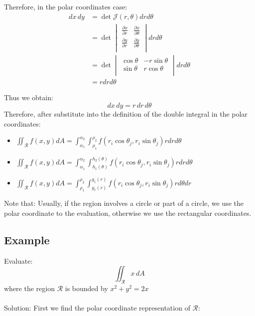 \documentclass[UTF8,a4paper, 10pt, openany]{svmono}
\begin{document}
Therefore, in the polar coordinates case:
\begin{align*}
dx \, dy& =\det\mathcal{J}(r,\theta)drd\theta\\
&=\det
\begin{vmatrix}
\frac{\partial x}{\partial r} & \frac{\partial x}{\partial \theta} \\
\frac{\partial y}{\partial r} & \frac{\partial y}{\partial \theta} \\
\end{vmatrix}drd\theta\\
&=\det
\begin{vmatrix}
\cos \theta & -r\sin \theta \\
\sin \theta & r\cos \theta \\
\end{vmatrix}drd\theta\\
&=rdrd\theta
\end{align*}

Thus we obtain:
$$dx \,dy=r \, dr \, d\theta$$
Therefore, after substitute into the definition of the double integral in the polar coordinates:

\begin{itemize}
\item $\displaystyle\iint_{\mathcal{R}}f(x,y)dA=\int_{\alpha_{1}}^{\alpha_{2}}\int_{\rho_{1}}^{\rho_{2}}f(r_{i}\cos \theta_{j},r_{i}\sin \theta_{j})rdrd\theta$
\item $\displaystyle\iint_{\mathcal{R}}f(x,y)dA=\int_{\alpha_{1}}^{\alpha_{2}}\int_{h_{1}(\theta)}^{h_{2}(\theta)}f(r_{i}\cos \theta_{j},r_{i}\sin \theta_{j})rdrd\theta$
\item $\displaystyle\iint_{\mathcal{R}}f(x,y)dA=\int_{\rho_{1}}^{\rho_{2}}\int_{g_{1}(r)}^{g_{1}(r)}f(r_{i}\cos \theta_{j},r_{i}\sin \theta_{j})rd\theta dr$
\end{itemize}

Note that: Usually, if the region involves a circle or part of a circle, we use the polar coordinate to the evaluation, otherwise we use the rectangular coordinates.

\subsection{Example}
Evaluate:
$$\iint_{\mathcal{R}}x \,dA$$
where the region $\mathcal{R}$ is bounded by $x^2+y^2=2x$\\ \\

Solution: First we find the polar coordinate representation of $\mathcal{R}$:\\
\end{document}
